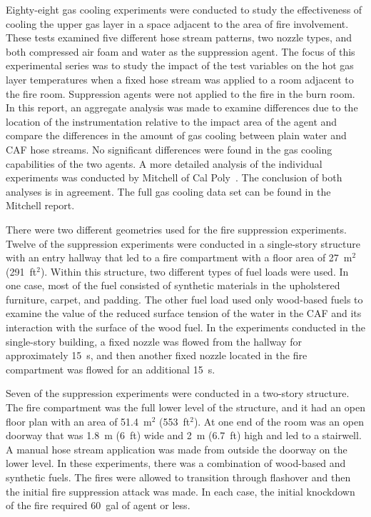 \documentclass[12pt,oneside]{book}
\begin{document}
Eighty-eight gas cooling experiments were conducted to study the effectiveness of cooling the upper gas layer in a space adjacent to the area of fire involvement. These tests examined five different hose stream patterns, two nozzle types, and both compressed air foam and water as the suppression agent. The focus of this experimental series was to study the impact of the test variables on the hot gas layer temperatures when a fixed hose stream was applied to a room adjacent to the fire room. Suppression agents were not applied to the fire in the burn room. In this report, an aggregate analysis was made to examine differences due to the location of the instrumentation relative to the impact area of the agent and compare the differences in the amount of gas cooling between plain water and CAF hose streams. No significant differences were found in the gas cooling capabilities of the two agents. A more detailed analysis of the individual experiments was conducted by Mitchell of Cal Poly~\cite{Mitchell:1}. The conclusion of both analyses is in agreement. The full gas cooling data set can be found in the Mitchell report.    

There were two different geometries used for the fire suppression experiments. Twelve of the suppression experiments were conducted in a single-story structure with an entry hallway that led to a fire compartment with a floor area of 27~m$^2$ (291~ft$^2$). Within this structure, two different types of fuel loads were used. In one case, most of the fuel consisted of synthetic materials in the upholstered furniture, carpet, and padding. The other fuel load used only wood-based fuels to examine the value of the reduced surface tension of the water in the CAF and its interaction with the surface of the wood fuel. In the experiments conducted in the single-story building, a fixed nozzle was flowed from the hallway for approximately 15~s, and then another fixed nozzle located in the fire compartment was flowed for an additional 15~s.   

Seven of the suppression experiments were conducted in a two-story structure.  The fire compartment was the full lower level of the structure, and it had an open floor plan with an area of 51.4~m$^2$ (553~ft$^2$). At one end of the room was an open doorway that was 1.8~m (6~ft) wide and 2~m (6.7~ft) high and led to a stairwell. A manual hose stream application was made from outside the doorway on the lower level. In these experiments, there was a combination of wood-based and synthetic fuels. The fires were allowed to transition through flashover and then the initial fire suppression attack was made. In each case, the initial knockdown of the fire required 60~gal of agent or less.   
\end{document}
